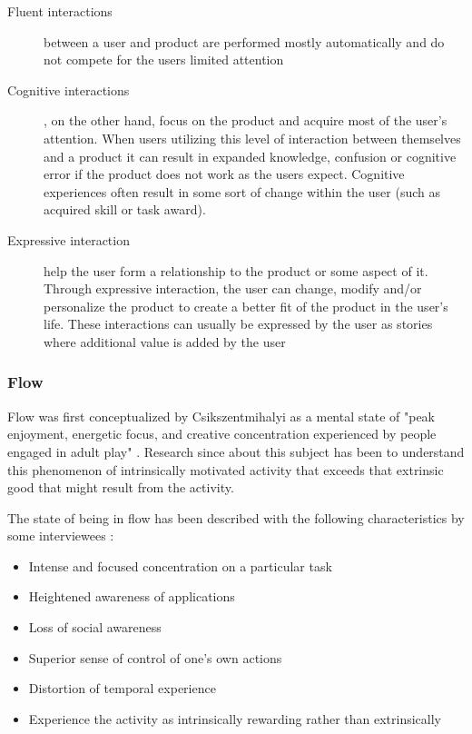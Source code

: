 \begin{description}
  \item[Fluent interactions] between a user and product are performed mostly automatically and do not compete for the users limited attention
  \item[Cognitive interactions], on the other hand, focus on the product and acquire most of the user's attention. When users utilizing this level of interaction between themselves and a product it can result in expanded knowledge, confusion or cognitive error if the product does not work as the users expect. Cognitive experiences often result in some sort of change within the user (such as acquired skill or task award).
  \item[Expressive interaction] help the user form a relationship to the product or some aspect of it. Through expressive interaction, the user can change, modify and/or personalize the product to create a better fit of the product in the user's life. These interactions can usually be expressed by the user as stories where additional value is added by the user
\end{description}

\subsubsection{Flow}
Flow was first conceptualized by Csikszentmihalyi as a mental state of "peak enjoyment, energetic focus, and creative concentration experienced by people engaged in adult play" \cite{Csikszentmihalyi1975}. Research since about this subject has been to understand this phenomenon of intrinsically motivated activity that exceeds that extrinsic good that might result from the activity.

The state of being in flow has been described with the following characteristics by some interviewees \cite{Nakamura2005}:

\begin{itemize}
  \item Intense and focused concentration on a particular task
  \item Heightened awareness of applications
  \item Loss of social awareness
  \item Superior sense of control of one's own actions
  \item Distortion of temporal experience
  \item Experience the activity as intrinsically rewarding rather than extrinsically
\end{itemize}

